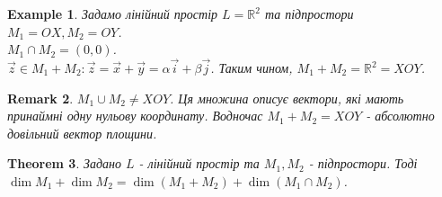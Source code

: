 \documentclass[a4paper, 10pt]{article}
\theoremstyle{theoremdd}
\newtheorem{theorem}{Theorem}[subsection]
\newtheorem{example}[theorem]{Example}
\newtheorem{remark}[theorem]{Remark}
\begin{document}
	\begin{example}
	Задамо лінійний простір $L=\mathbb{R}^2$ та підпростори $M_1 = OX, M_2 = OY$.\\
	$M_1 \cap M_2 = (0,0)$.\\
	$\vec{z} \in M_1 + M_2: \vec{z} = \vec{x} + \vec{y} = \alpha \vec{i} + \beta \vec{j}$. Таким чином, $M_1 + M_2 = \mathbb{R}^2 = XOY$.
	\end{example}
	
	\begin{remark}
	$M_1 \cup M_2 \neq XOY$. Ця множина описує вектори, які мають принаймні одну нульову координату. Водночас $M_1 + M_2 = XOY$ - абсолютно довільний вектор площини.
	\end{remark}
	
	\begin{theorem}
	Задано $L$ - лінійний простір та $M_1,M_2$ - підпростори. Тоді\\
	$\dim{M_1} + \dim{M_2} = \dim(M_1 + M_2) + \dim(M_1 \cap M_2)$.
	\end{theorem}
	
\end{document}
